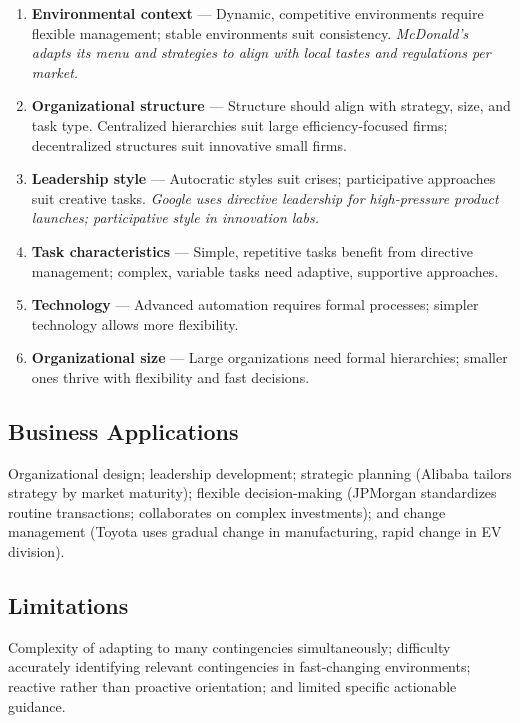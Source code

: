 \documentclass[11pt, letterpaper]{article}
\begin{document}
\begin{enumerate}[leftmargin=*, label=\textbf{\arabic*.}]
  \item \textbf{Environmental context} --- Dynamic, competitive environments require flexible management; stable environments suit consistency. \textit{McDonald's adapts its menu and strategies to align with local tastes and regulations per market.}
  \item \textbf{Organizational structure} --- Structure should align with strategy, size, and task type. Centralized hierarchies suit large efficiency-focused firms; decentralized structures suit innovative small firms.
  \item \textbf{Leadership style} --- Autocratic styles suit crises; participative approaches suit creative tasks. \textit{Google uses directive leadership for high-pressure product launches; participative style in innovation labs.}
  \item \textbf{Task characteristics} --- Simple, repetitive tasks benefit from directive management; complex, variable tasks need adaptive, supportive approaches.
  \item \textbf{Technology} --- Advanced automation requires formal processes; simpler technology allows more flexibility.
  \item \textbf{Organizational size} --- Large organizations need formal hierarchies; smaller ones thrive with flexibility and fast decisions.
\end{enumerate}

\subsection{Business Applications}

Organizational design; leadership development; strategic planning (Alibaba tailors strategy by market maturity); flexible decision-making (JPMorgan standardizes routine transactions; collaborates on complex investments); and change management (Toyota uses gradual change in manufacturing, rapid change in EV division).

\subsection{Limitations}

Complexity of adapting to many contingencies simultaneously; difficulty accurately identifying relevant contingencies in fast-changing environments; reactive rather than proactive orientation; and limited specific actionable guidance.
\end{document}
